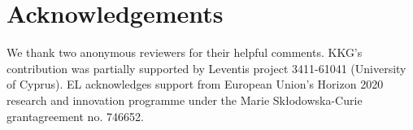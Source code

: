 \documentclass[output=paper]{langsci/langscibook}
\begin{document}
\printchapterglossary{}

\section*{Acknowledgements}

We thank two anonymous reviewers for their helpful comments. KKG’s contribution
was partially supported by Leventis project 3411-61041 (University of Cyprus).
EL acknowledges support from European Union’s Horizon 2020 research and
innovation programme under the Marie Skłodowska-Curie grant\linebreak agreement no.
746652.

{\sloppy
\printbibliography[heading=subbibliography,notkeyword=this]
}
\end{document}

